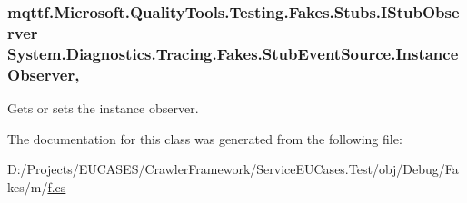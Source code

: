 \hypertarget{class_system_1_1_diagnostics_1_1_tracing_1_1_fakes_1_1_stub_event_source_ad7ef750d37fbfd4ca8a9ab7ec9469a84}{
\subsubsection[{Instance\-Observer}]{\setlength{\rightskip}{0pt plus 5cm}mqttf.\-Microsoft.\-Quality\-Tools.\-Testing.\-Fakes.\-Stubs.\-I\-Stub\-Observer System.\-Diagnostics.\-Tracing.\-Fakes.\-Stub\-Event\-Source.\-Instance\-Observer\hspace{0.3cm}{\ttfamily [get]}, {\ttfamily [set]}}}\label{class_system_1_1_diagnostics_1_1_tracing_1_1_fakes_1_1_stub_event_source_ad7ef750d37fbfd4ca8a9ab7ec9469a84}


Gets or sets the instance observer.



The documentation for this class was generated from the following file\-:\begin{DoxyCompactItemize}
\item 
D\-:/\-Projects/\-E\-U\-C\-A\-S\-E\-S/\-Crawler\-Framework/\-Service\-E\-U\-Cases.\-Test/obj/\-Debug/\-Fakes/m/\hyperlink{m_2f_8cs}{f.\-cs}\end{DoxyCompactItemize}
